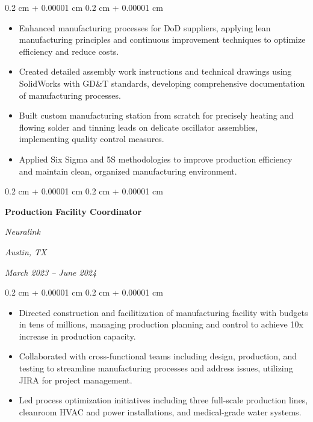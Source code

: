 \documentclass[10pt, letterpaper]{article}
\newenvironment{highlights}{
    \begin{itemize}[
        topsep=0.10 cm,
        parsep=0.10 cm,
        partopsep=0pt,
        itemsep=0pt,
        leftmargin=0.4 cm + 10pt
    ]
}{
    \end{itemize}
} %
\newenvironment{onecolentry}{
    \begin{adjustwidth}{
        0.2 cm + 0.00001 cm
    }{
        0.2 cm + 0.00001 cm
    }
}{
    \end{adjustwidth}
} %
\newenvironment{twocolentry}[2][]{
    \onecolentry
    \def\secondColumn{#2}
    \setcolumnwidth{\fill, 9.0 cm}
    \begin{paracol}{2}
}{
    \switchcolumn \raggedleft \secondColumn
    \end{paracol}
    \endonecolentry
} %
\begin{document}
        \vspace{0.10 cm}
        \begin{onecolentry}
            \begin{highlights}
                \item Enhanced manufacturing processes for DoD suppliers, applying lean manufacturing principles and continuous improvement techniques to optimize efficiency and reduce costs.
                \item Created detailed assembly work instructions and technical drawings using SolidWorks with GD\&T standards, developing comprehensive documentation of manufacturing processes.
                \item Built custom manufacturing station from scratch for precisely heating and flowing solder and tinning leads on delicate oscillator assemblies, implementing quality control measures.
                \item Applied Six Sigma and 5S methodologies to improve production efficiency and maintain clean, organized manufacturing environment.
            \end{highlights}
        \end{onecolentry}


        \vspace{0.35 cm}

        \begin{twocolentry}{
        \textit{Austin, TX}    
            
        \textit{March 2023 – June 2024}}
            \textbf{Production Facility Coordinator}
            
            \textit{Neuralink}
        \end{twocolentry}

        \vspace{0.10 cm}
        \begin{onecolentry}
            \begin{highlights}
                \item Directed construction and facilitization of manufacturing facility with budgets in tens of millions, managing production planning and control to achieve 10x increase in production capacity.
                \item Collaborated with cross-functional teams including design, production, and testing to streamline manufacturing processes and address issues, utilizing JIRA for project management.
                \item Led process optimization initiatives including three full-scale production lines, cleanroom HVAC and power installations, and medical-grade water systems.
            \end{highlights}
        \end{onecolentry}
\end{document}
